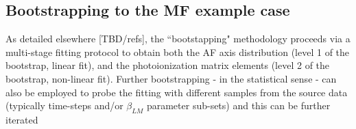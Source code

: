 \subsection{Bootstrapping to the MF example case}

As detailed elsewhere [TBD/refs], the ``bootstapping" methodology proceeds via a multi-stage fitting protocol to obtain both the AF axis distribution (level 1 of the bootstrap, linear fit), and the photoionization matrix elements (level 2 of the bootstrap, non-linear fit). Further bootstrapping - in the statistical sense - can also be employed to probe the fitting with different samples from the source data (typically time-steps and/or $\beta_{LM}$ parameter sub-sets) and this can be further iterated 